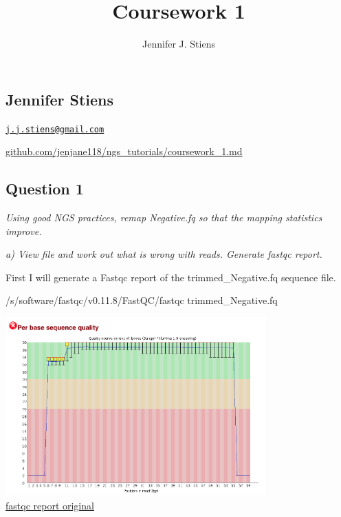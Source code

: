 \documentclass[]{article}
\title{Coursework 1}
\author{Jennifer J. Stiens}
\date{}
\newenvironment{Shaded}{\begin{snugshade}}{\end{snugshade}}
\newcommand{\ExtensionTok}[1]{#1}
\newcommand{\NormalTok}[1]{#1}
\begin{document}
\maketitle

\subsection{Jennifer Stiens}\label{jennifer-stiens}

\href{mailto:j.j.stiens@gmail.com}{\nolinkurl{j.j.stiens@gmail.com}}

\href{https://github.com/jenjane118/ngs_tutorials}{github.com/jenjane118/ngs\_tutorials/coursework\_1.md}

\subsection{Question 1}\label{question-1}

\emph{Using good NGS practices, remap Negative.fq so that the mapping
statistics improve.}

\emph{a) View file and work out what is wrong with reads. Generate
fastqc report.}

First I will generate a Fastqc report of the trimmed\_Negative.fq
sequence file.

\begin{Shaded}
\begin{Highlighting}[]
\ExtensionTok{/s/software/fastqc/v0.11.8/FastQC/fastqc}\NormalTok{ trimmed_Negative.fq}
\end{Highlighting}
\end{Shaded}

\includegraphics[width=0.75000\textwidth]{trimmed_Negative_fastqc.png}\\
\href{/d/projects/u/sj003/course_materials/fastq/coursework_1/trimmed_Negative_fastqc.html}{fastqc
report original}
\end{document}
